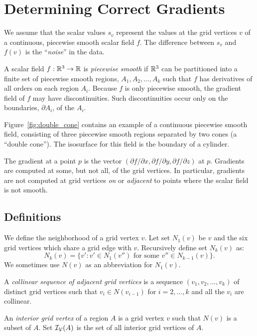 \section{Determining Correct Gradients}
\label{sec:gradients}

We assume that the scalar values $s_v$ represent the values at the grid vertices $v$
of a continuous, piecewise smooth scalar field $f$. The difference between $s_v$ and $f(v)$ is the ``\textit{noise}'' in the data.

A scalar field $f :\mathbb{R}^{3} \rightarrow \mathbb{R}$ is {\em piecewise smooth}
if $\mathbb{R}^{3}$ can be partitioned into a finite set of piecewise smooth regions,
$A_1, A_2, \ldots, A_k$
such that $f$ has derivatives of all orders on each region $A_i$.
Because $f$ is only piecewise smooth,
the gradient field of $f$ may have discontinuities. Such discontinuities occur only on the boundaries, $\partial A_i$, 
of the $A_i$.

Figure~\ref{fig:double_cone} contains an example 
of a continuous piecewise smooth field,
consisting of three piecewise smooth regions
separated by two cones (a ``double cone'').
The isosurface for this field is the boundary of a cylinder.

The gradient at a point $p$ is the vector
$(\partial f/\partial x, \partial f/\partial y, \partial f/\partial z)$ at $p$.
Gradients are computed at some, but not all, of the grid vertices.
In particular, gradients are not computed at grid vertices \textit{on} 
or \textit{adjacent} to points where the scalar field is not smooth.

\subsection{Definitions}

We define the neighborhood of a grid vertex $v$.
Let set $N_1(v)$ be $v$ and the six grid vertices
which share a grid edge with $v$.
Recursively define set $N_k(v)$ as:
\begin{equation*}
N_k(v) = \{v': v' \in N_1(v'') \mbox{ for some } v'' \in N_{k-1}(v)\}.
\end{equation*}
We sometimes use $N(v)$ as an abbreviation for $N_1(v)$.

A {\em collinear sequence of adjacent grid vertices}
is a sequence $(v_1,v_2,\ldots,v_k)$ of distinct grid vertices
such that $v_i \in N(v_{i-1})$ for $i = 2,\ldots, k$
and all the $v_i$ are collinear.

An {\em interior grid vertex} of a region $A$
is a grid vertex $v$ such that $N(v)$ is a subset of $A$.
Set $\mathcal{I_V}(A)$ is the set of all interior grid vertices of $A$.

